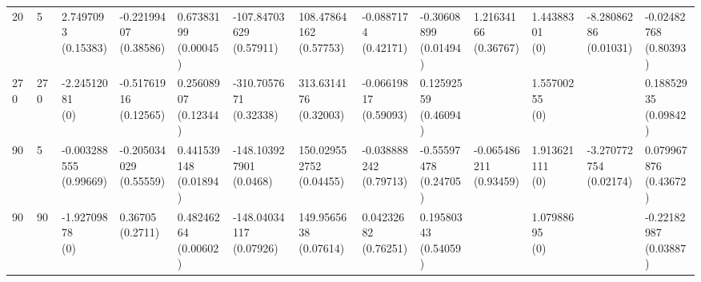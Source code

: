\documentclass[12pt,a4paper,twoside,openany]{book}
\begin{document}
\begin{table}[ht]
{\begin{tabular}{lllllllllllll}
  20 & 5 & \makecell{2.7497093 \\ (0.15383)} & \makecell{-0.22199407 \\ (0.38586)} & \makecell{0.67383199 \\ (0.00045)} & \makecell{-107.84703629 \\ (0.57911)} & \makecell{108.47864162 \\ (0.57753)} & \makecell{-0.0887174 \\ (0.42171)} & \makecell{-0.30608899 \\ (0.01494)} & \makecell{1.21634166 \\ (0.36767)} & \makecell{1.44388301 \\ (0)} & \makecell{-8.28086286 \\ (0.01031)} & \makecell{-0.02482768 \\ (0.80393)} \\ 
  270 & 270 & \makecell{-2.24512081 \\ (0)} & \makecell{-0.51761916 \\ (0.12565)} & \makecell{0.25608907 \\ (0.12344)} & \makecell{-310.7057671 \\ (0.32338)} & \makecell{313.6314176 \\ (0.32003)} & \makecell{-0.06619817 \\ (0.59093)} & \makecell{0.12592559 \\ (0.46094)} &  & \makecell{1.55700255 \\ (0)} &  & \makecell{0.18852935 \\ (0.09842)} \\ 
  90 & 5 & \makecell{-0.003288555 \\ (0.99669)} & \makecell{-0.205034029 \\ (0.55559)} & \makecell{0.441539148 \\ (0.01894)} & \makecell{-148.103927901 \\ (0.0468)} & \makecell{150.029552752 \\ (0.04455)} & \makecell{-0.038888242 \\ (0.79713)} & \makecell{-0.55597478 \\ (0.24705)} & \makecell{-0.065486211 \\ (0.93459)} & \makecell{1.913621111 \\ (0)} & \makecell{-3.270772754 \\ (0.02174)} & \makecell{0.079967876 \\ (0.43672)} \\ 
  90 & 90 & \makecell{-1.92709878 \\ (0)} & \makecell{0.36705 \\ (0.2711)} & \makecell{0.48246264 \\ (0.00602)} & \makecell{-148.04034117 \\ (0.07926)} & \makecell{149.9565638 \\ (0.07614)} & \makecell{0.04232682 \\ (0.76251)} & \makecell{0.19580343 \\ (0.54059)} &  & \makecell{1.07988695 \\ (0)} &  & \makecell{-0.22182987 \\ (0.03887)} \\ 

\end{tabular}}
\end{table}
\end{document}
